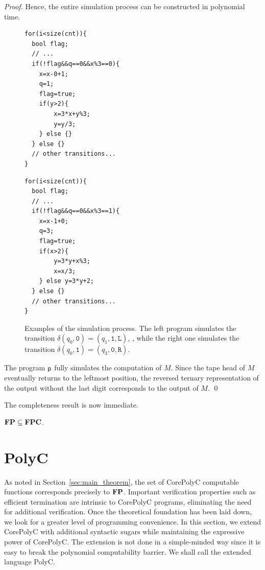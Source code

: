 \documentclass[runningheads]{llncs}
\begin{document}
\begin{proof}
Hence, the entire simulation process can be constructed in polynomial time.
\begin{figure}[t]
	\begin{minipage}{0.48\linewidth}
		\centering
\begin{lstlisting}[xleftmargin=1em,xrightmargin=1em]
for(i<size(cnt)){
  bool flag;
  // ...
  if(!flag&&q==0&&x%3==0){
    x=x-0+1;
    q=1;
    flag=true;
    if(y>2){
        x=3*x+y%3;
        y=y/3;
    } else {}
  } else {}
  // other transitions...
}
\end{lstlisting}
	\end{minipage}
	\hspace{10mm}
	\begin{minipage}{0.48\linewidth}
		\centering
\begin{lstlisting}[xleftmargin=1em,xrightmargin=1em]
for(i<size(cnt)){
  bool flag;
  // ...
  if(!flag&&q==0&&x%3==1){
    x=x-1+0;
    q=3;
    flag=true;
    if(x>2){
        y=3*y+x%3;
        x=x/3;
    } else y=3*y+2;
  } else {}
  // other transitions...
}
\end{lstlisting}
	\end{minipage}
	\caption{Examples of the simulation process.
    The left program simulates the transition $\delta(q_0,\texttt{0})=(q_1,\texttt{1},\mathtt{L})$, 
 , while the right one simulates the transition $\delta(q_0,\texttt{1})=(q_3,\texttt{0},\mathtt{R})$.
    }
 \label{fig:simulation}
\end{figure}


The program $\mathsf{p}$ fully simulates the computation of $M$. Since the tape head of $M$ eventually returns to the leftmost position, the reversed ternary representation of the output without the last digit corresponds to the output of $M$.
\qed
\end{proof}

The completeness result is now immediate.
\begin{theorem}[Completeness]
\label{thm:completeness}
$\mathbf{FP}\subseteq\mathbf{FPC}$.
\end{theorem}
\section{PolyC}\label{sec:polyc}

As noted in Section~\ref{sec:main_theorem}, the set of CorePolyC computable functions corresponds precisely to $\mathbf{FP}$.
Important verification properties such as efficient termination are intrinsic to CorePolyC programs, eliminating the need for additional verification. 
Once the theoretical foundation has been laid down, we look for a greater level of programming convenience. 
In this section, we extend CorePolyC with additional syntactic sugars while maintaining the expressive power of CorePolyC.
The extension is not done in a simple-minded way since it is easy to break the polynomial computability barrier. 
We shall call the extended language PolyC. 
\end{document}
